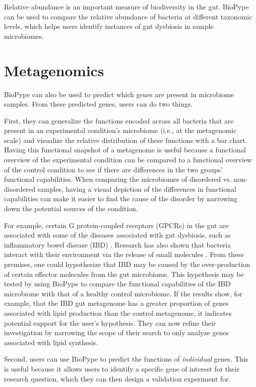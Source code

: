 {Relative abundance is an important measure of biodiversity in the gut. 
BioPype can be used to compare the relative abundance of bacteria at different taxonomic levels, which helps users identify instances of gut dysbiosis in sample microbiomes.

\section{Metagenomics}

BioPype can also be used to predict which genes are present in microbiome samples. From these predicted genes, users can do two things. 

First, they can generalize the functions encoded across all bacteria that are present in an experimental condition's microbiome (i.e., at the metagenomic scale) and visualize the relative distribution of these functions with a bar chart. Having this functional snapshot of a metagenome is useful because a functional overview of the experimental condition can be compared to a functional overview of the control condition to see if there are differences in the two groups' functional capabilities. When comparing the microbiomes of disordered vs. non-disordered samples, having a visual depiction of the differences in functional capabilities can make it easier to find the cause of the disorder by narrowing down the potential sources of the condition. 

For example, certain G protein-coupled receptors (GPCRs) in the gut are associated with some of the diseases associated with gut dysbiosis, such as inflammatory bowel disease (IBD) \citep{Cohen2017}. Research has also shown that bacteria interact with their environment via the release of small molecules \citep{Li2012}. From these premises, one could hypothesize that IBD may be caused by the over-production of certain effector molecules from the gut microbiome. This hypothesis may be tested by using BioPype to compare the functional capabilities of the IBD microbiome with that of a healthy control microbiome. If the results show, for example, that the IBD gut metagenome has a greater proportion of genes associated with lipid production than the control metagenome, it indicates potential support for the user's hypothesis. They can now refine their investigation by narrowing the scope of their search to only analyze genes associated with lipid synthesis.

Second, users can use BioPype to predict the functions of \textit{individual} genes. This is useful because it allows users to identify a specific gene of interest for their research question, which they can then design a validation experiment for. 

}
